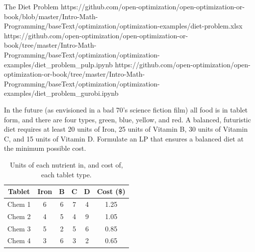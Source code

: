 \begin{examplewithallcode}{The Diet Problem}
{https://github.com/open-optimization/open-optimization-or-book/blob/master/Intro-Math-Programming/baseText/optimization/optimization-examples/diet-problem.xlsx}
{https://github.com/open-optimization/open-optimization-or-book/tree/master/Intro-Math-Programming/baseText/optimization/optimization-examples/diet_problem_pulp.ipynb}
{https://github.com/open-optimization/open-optimization-or-book/tree/master/Intro-Math-Programming/baseText/optimization/optimization-examples/diet_problem_gurobi.ipynb}
\label{example:diet-problem}

In the future (as envisioned in a bad 70's science fiction film) all food is in tablet form, and there are four types, green, blue, yellow, and red. A balanced, futuristic diet requires at least 20 units of Iron, 25 units of Vitamin B, 30 units of Vitamin C, and 15 units of Vitamin D. Formulate an LP that ensures a balanced diet at the minimum possible cost.
\end{examplewithallcode}

\begin{table}[h!]
\begin{center}
\begin{tabular}{|c|c|c|c|c|c|}
\hline
Tablet & Iron & B & C & D & Cost (\$) \\ \hline
Chem 1 & 6 & 6 & 7 & 4 & 1.25 \\
Chem 2 & 4 & 5 & 4 & 9 & 1.05 \\
Chem 3 & 5 & 2 & 5 & 6 & 0.85 \\
Chem 4 & 3 & 6 & 3 & 2 & 0.65 \\
\hline
\end{tabular}
\end{center}
\caption{Units of each nutrient in, and cost of, each tablet type.}\label{tab:pillContent}%
\end{table}

